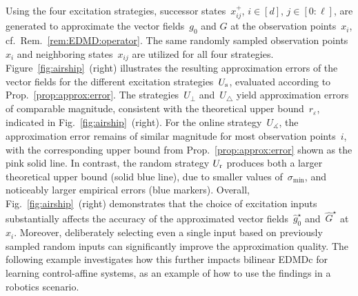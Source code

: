 \documentclass[a4paper, reqno]{amsart}
\newcommand{\dd}{\ell}
\begin{document}
Using the four excitation strategies, successor states~$x_{ij}^+$, $i\in[d]$, $j\in[0:\dd]$, are generated to approximate the vector fields~$g_0$ and $G$ at the observation points~$x_i$, cf.~Rem.~\ref{rem:EDMD:operator}.
The same randomly sampled observation points~$x_i$ and neighboring states~$x_{ij}$ are utilized for all four strategies.
Figure~\ref{fig:airship}~(right) illustrates the resulting approximation errors of the vector fields for the different excitation strategies~$U_{\textnormal{s}}$, evaluated according to Prop.~\ref{prop:approx:error}.
%
The strategies~$U_\perp$ and~$U_\triangle$ yield approximation errors of comparable magnitude, consistent with the theoretical upper bound~$r_\varepsilon$, indicated in Fig.~\ref{fig:airship}~(right).
%
For the online strategy~$U_{\measuredangle}$, the approximation error remains of similar magnitude for most observation points~$i$, with the corresponding upper bound from Prop.~\ref{prop:approx:error} shown as the pink solid line.
%
In contrast, the random strategy $U_\textnormal{r}$ produces both a larger theoretical upper bound (solid blue line), due to smaller values of~$\sigma_{\min}$, and noticeably larger empirical errors (blue markers).
%
Overall, Fig.~\ref{fig:airship}~(right) demonstrates that the choice of excitation inputs substantially affects the accuracy of the approximated vector fields~$\hat{g}_0^\star$ and~$\hat{G}^\star$ at $x_i$.
Moreover, deliberately selecting even a single input based on previously sampled random inputs can significantly improve the approximation quality.
The following example investigates how this further impacts bilinear EDMDc for learning control-affine systems, as an example of how to use the findings in a robotics scenario.
%
\end{document}
